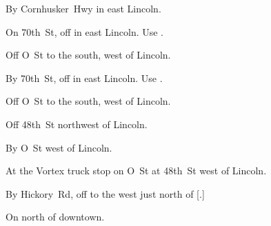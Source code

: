 
\begin{LocationList}

By  Cornhusker~Hwy in east Lincoln.

On 70th~St, off  in east Lincoln.
Use  .

\Location{\GarageHQ \Garage}
Off  O~St to the south, west of Lincoln.

By 70th~St, off  in east Lincoln.
Use  .

Off  O~St to the south, west of Lincoln.

Off  48th~St northwest of Lincoln.

\Location{\RecruitmentAgency \Recruitment}
By  O~St west of Lincoln.

At the Vortex truck stop on  O~St at  48th~St west of Lincoln.

By Hickory~Rd, off  to the west just north of [.]

On  north of downtown.

\end{LocationList}
